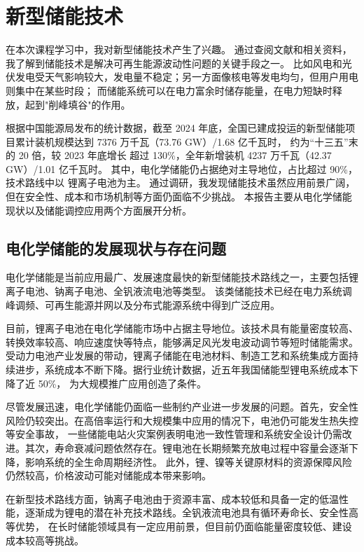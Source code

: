 \section{新型储能技术}

在本次课程学习中，我对新型储能技术产生了兴趣。
通过查阅文献和相关资料，我了解到储能技术是解决可再生能源波动性问题的关键手段之一。
比如风电和光伏发电受天气影响较大，发电量不稳定；另一方面像核电等发电均匀，但用户用电则集中在某些时段；
而储能系统可以在电力富余时储存能量，在电力短缺时释放，起到"削峰填谷"的作用。

根据中国能源局发布的统计数据，截至 2024 年底，全国已建成投运的新型储能项目累计装机规模达到 7376 万千瓦（73.76 GW）/1.68 亿千瓦时，
约为“十三五”末的 20 倍，较 2023 年底增长 超过 130\%，全年新增装机 4237 万千瓦（42.37 GW）/1.01 亿千瓦时。
其中，电化学储能仍占据绝对主导地位，占比超过 90\%，技术路线中以 锂离子电池为主。
通过调研，我发现储能技术虽然应用前景广阔，但在安全性、成本和市场机制等方面仍面临不少挑战。
本报告主要从电化学储能现状以及储能调控应用两个方面展开分析。


\subsection{电化学储能的发展现状与存在问题}

电化学储能是当前应用最广、发展速度最快的新型储能技术路线之一，主要包括锂离子电池、钠离子电池、全钒液流电池等类型。
该类储能技术已经在电力系统调峰调频、可再生能源并网以及分布式能源系统中得到广泛应用。

目前，锂离子电池在电化学储能市场中占据主导地位。该技术具有能量密度较高、转换效率较高、响应速度快等特点，能够满足风光发电波动调节等短时储能需求。
受动力电池产业发展的带动，锂离子储能在电池材料、制造工艺和系统集成方面持续进步，系统成本不断下降。据行业统计数据，近五年我国储能型锂电系统成本下降了近 50\%，
为大规模推广应用创造了条件。

尽管发展迅速，电化学储能仍面临一些制约产业进一步发展的问题。首先，安全性风险仍较突出。在高倍率运行和大规模集中应用的情况下，电池仍可能发生热失控等安全事故，
一些储能电站火灾案例表明电池一致性管理和系统安全设计仍需改进。其次，寿命衰减问题依然存在。锂电池在长期频繁充放电过程中容量会逐渐下降，影响系统的全生命周期经济性。
此外，锂、镍等关键原材料的资源保障风险仍然较高，价格波动可能对储能成本带来影响。

在新型技术路线方面，钠离子电池由于资源丰富、成本较低和具备一定的低温性能，逐渐成为锂电的潜在补充技术路线。全钒液流电池具有循环寿命长、安全性高等优势，
在长时储能领域具有一定应用前景，但目前仍面临能量密度较低、建设成本较高等挑战。

